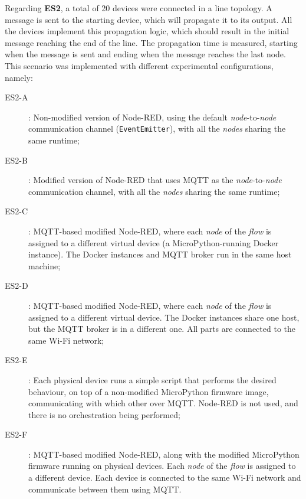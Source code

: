 Regarding \textbf{ES2}, a total of 20 devices were connected in a line topology. A message is sent to the starting device, which will propagate it to its output. All the devices implement this propagation logic, which should result in the initial message reaching the end of the line. The propagation time is measured, starting when the message is sent and ending when the message reaches the last node. This scenario was implemented with different experimental configurations, namely:
\begin{description}
    \item[ES2-A]: Non-modified version of Node-RED, using the default \textit{node}-to-\textit{node} communication channel (\texttt{EventEmitter}), with all the \textit{nodes} sharing the same runtime;
    
    \item[ES2-B]: Modified version of Node-RED that uses MQTT as the \textit{node}-to-\textit{node} communication channel, with all the \textit{nodes} sharing the same runtime;
    
    \item[ES2-C]: MQTT-based modified Node-RED, where each \textit{node} of the \textit{flow} is assigned to a different virtual device (\ie a MicroPython-running Docker instance). The Docker instances and MQTT broker run in the same host machine;
    
    \item[ES2-D]: MQTT-based modified Node-RED, where each \textit{node} of the \textit{flow} is assigned to a different virtual device. The Docker instances share one host, but the MQTT broker is in a different one. All parts are connected to the same Wi-Fi network;
    
    \item[ES2-E]: Each physical device runs a simple script that performs the desired behaviour, on top of a non-modified MicroPython firmware image, communicating with which other over MQTT. Node-RED is not used, and there is no orchestration being performed;

    \item[ES2-F]: MQTT-based modified Node-RED, along with the modified MicroPython firmware running on physical devices. Each \textit{node} of the \textit{flow} is assigned to a different device. Each device is connected to the same Wi-Fi network and communicate between them using MQTT. 
\end{description}


